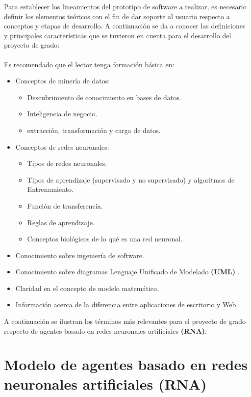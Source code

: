 Para establecer los lineamientos del prototipo de software a realizar, es necesario definir los elementos teóricos con el fin de dar soporte al usuario respecto a conceptos y etapas de desarrollo. A continuación se da a conocer las definiciones y principales características que se tuvieron en cuenta para el desarrollo del proyecto de grado:
\\\\
Es recomendado que el lector tenga formación básica en:

\begin{itemize}
	\item {Conceptos de minería de datos:
		\begin{itemize}
			\item Descubrimiento de conocimiento en bases de datos.
			\item Inteligencia de negocio.
			\item extracción, transformación y carga de datos.
		\end{itemize}
	}	
	
	\item {Conceptos de redes neuronales:
		\begin{itemize}
			\item Tipos de redes neuronales.
			\item Tipos de aprendizaje (supervisado y no supervisado) y algoritmos de Entrenamiento. 		
		    \item Función de transferencia.
		    \item Reglas de aprendizaje.
		    \item Conceptos biológicos de lo qué es una red neuronal.	
		    
		\end{itemize}
	}
	\item Conocimiento sobre ingeniería de software.
	\item Conocimiento sobre diagramas Lenguaje Unificado de Modelado \textbf{(UML)} .
	\item Claridad en el concepto de modelo matemático.
	\item Información acerca de la diferencia entre aplicaciones de escritorio y Web.
\end{itemize}

A continuación se ilustran los términos más relevantes para el proyecto de grado respecto de agentes basado en redes neuronales artificiales \textbf{(RNA)}.
\section{Modelo de agentes basado en redes neuronales artificiales \textbf{(RNA)}}

